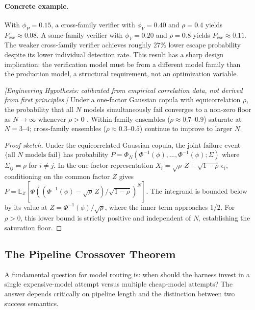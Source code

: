 \paragraph{Concrete example.} With $\phi_P = 0.15$, a cross-family verifier with $\phi_V = 0.40$ and $\rho = 0.4$ yields $P_{\mathrm{esc}} \approx 0.08$. A same-family verifier with $\phi_V = 0.20$ and $\rho = 0.8$ yields $P_{\mathrm{esc}} \approx 0.11$. The weaker cross-family verifier achieves roughly 27\% lower escape probability despite its lower individual detection rate. This result has a sharp design implication: the verification model must be from a different model family than the production model, a structural requirement, not an optimization variable.

\begin{proposition}
\emph{[Engineering Hypothesis: calibrated from empirical correlation data, not derived from first principles.]}
\label{prop:routing-saturation}
Under a one-factor Gaussian copula with equicorrelation $\rho$, the probability that all $N$ models simultaneously fail converges to a non-zero floor as $N \to \infty$ whenever $\rho > 0$ \citep{correlatedensemble2026}. Within-family ensembles ($\rho \approx 0.7$--$0.9$) saturate at $N = 3$--$4$; cross-family ensembles ($\rho \approx 0.3$--$0.5$) continue to improve to larger $N$.
\end{proposition}

\begin{proof}[Proof sketch]
Under the equicorrelated Gaussian copula, the joint failure event $\{\text{all } N \text{ models fail}\}$ has probability $P = \Phi_N(\Phi^{-1}(\phi), \ldots, \Phi^{-1}(\phi); \Sigma)$ where $\Sigma_{ij} = \rho$ for $i \neq j$. In the one-factor representation $X_i = \sqrt{\rho}\,Z + \sqrt{1-\rho}\,\epsilon_i$, conditioning on the common factor $Z$ gives $P = \mathbb{E}_Z[\Phi((\Phi^{-1}(\phi) - \sqrt{\rho}\,Z)/\sqrt{1-\rho})^N]$. The integrand is bounded below by its value at $Z = \Phi^{-1}(\phi)/\sqrt{\rho}$, where the inner term approaches 1/2. For $\rho > 0$, this lower bound is strictly positive and independent of $N$, establishing the saturation floor.
\end{proof}

\subsection{The Pipeline Crossover Theorem}

A fundamental question for model routing is: when should the harness invest in a single expensive-model attempt versus multiple cheap-model attempts? The answer depends critically on pipeline length and the distinction between two success semantics.

